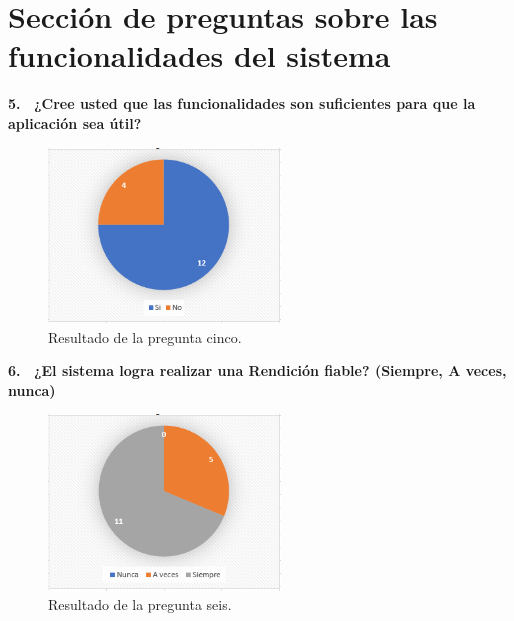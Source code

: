 \section{Sección de preguntas sobre las funcionalidades del sistema}

\textbf{5.  ¿Cree usted que las funcionalidades son suficientes para que la aplicación sea útil?}

\begin{figure}[h!]
    \centering
    \includegraphics[width=0.55\textwidth]{Imagenes/Pregunta5.1.png}
    \caption{\label{fig: Pregunta5}Resultado de la pregunta cinco.}
\end{figure}

\textbf{6.  ¿El sistema logra realizar una Rendición fiable? (Siempre, A veces, nunca)}

\begin{figure}[h!]
    \centering
    \includegraphics[width=0.55\textwidth]{Imagenes/Pregunta6.1.png}
    \caption{\label{fig: Pregunta6}Resultado de la pregunta seis.}
\end{figure}